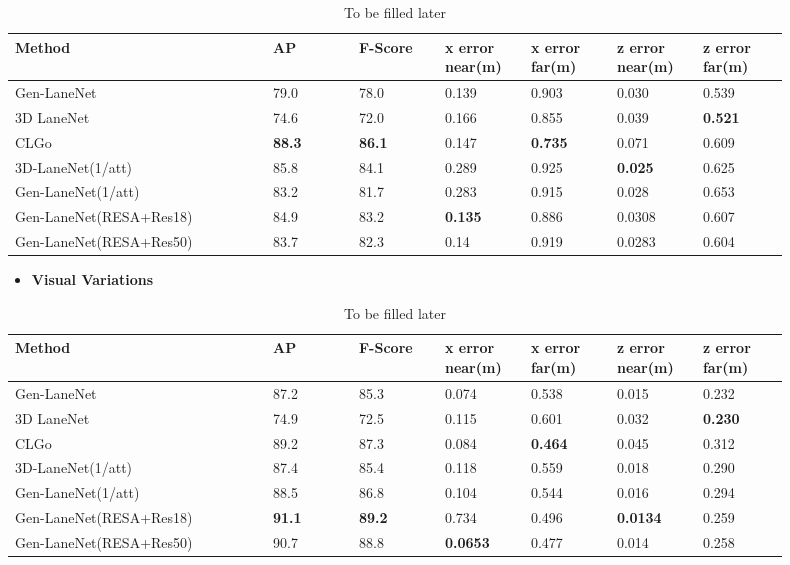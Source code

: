         \begin{table}[htbp]
    \centering
    \caption{To be filled later}
    \begin{tabular}{|p{0.3\linewidth}|p{0.1\linewidth}|p{0.1\linewidth}|p{0.1\linewidth}|p{0.1\linewidth}|p{0.1\linewidth}|p{0.1\linewidth}|}
    \hline
        \textbf{Method} & \textbf{AP} & \textbf{F-Score} & \textbf{x error near(m)} & \textbf{x error far(m)} & \textbf{z error near(m)} & \textbf{z error far(m)} \\ \hline
        Gen-LaneNet & 79.0 & 78.0 & 0.139 & 0.903 & 0.030 & 0.539 \\ \hline
        3D LaneNet & 74.6 & 72.0 & 0.166 & 0.855 & 0.039 &\textbf{ 0.521} \\ \hline
        CLGo &\textbf{ 88.3} &\textbf{ 86.1} & 0.147 & \textbf{0.735} & 0.071 & 0.609 \\ \hline
        3D-LaneNet(1/att) & 85.8 & 84.1 & 0.289 & 0.925 &\textbf{ 0.025} & 0.625 \\ \hline
        Gen-LaneNet(1/att) & 83.2 & 81.7 & 0.283 & 0.915 & 0.028 & 0.653 \\ \hline
        Gen-LaneNet(RESA+Res18) &  84.9 & 83.2 &\textbf{ 0.135} & 0.886 & 0.0308 & 0.607 \\ \hline
        Gen-LaneNet(RESA+Res50) & 83.7 & 82.3 & 0.14 & 0.919 & 0.0283 & 0.604 \\ \hline
    \end{tabular}
\end{table}

  \begin{itemize}
        \item \textbf{Visual Variations}
    \end{itemize}
    
        \begin{table}[htbp]
    \centering
    \caption{To be filled later}
    \begin{tabular}{|p{0.3\linewidth}|p{0.1\linewidth}|p{0.1\linewidth}|p{0.1\linewidth}|p{0.1\linewidth}|p{0.1\linewidth}|p{0.1\linewidth}|}
    \hline
        \textbf{Method} & \textbf{AP} & \textbf{F-Score} & \textbf{x error near(m)} & \textbf{x error far(m)} & \textbf{z error near(m)} & \textbf{z error far(m)} \\ \hline
        Gen-LaneNet & 87.2 & 85.3 & 0.074 & 0.538 & 0.015 & 0.232 \\ \hline
        3D LaneNet & 74.9 & 72.5 & 0.115 & 0.601 & 0.032 & \textbf{0.230} \\ \hline
        CLGo & 89.2 & 87.3 & 0.084 & \textbf{0.464} & 0.045 & 0.312 \\ \hline
        3D-LaneNet(1/att) & 87.4 & 85.4 & 0.118 & 0.559 & 0.018 & 0.290 \\ \hline
        Gen-LaneNet(1/att) & 88.5 & 86.8 & 0.104 & 0.544 & 0.016 & 0.294 \\ \hline
        Gen-LaneNet(RESA+Res18) & \textbf{ 91.1} &\textbf{ 89.2} & 0.734 & 0.496 & \textbf{0.0134} & 0.259 \\ \hline
        Gen-LaneNet(RESA+Res50) & 90.7 & 88.8 & \textbf{0.0653} & 0.477 & 0.014 & 0.258 \\ \hline
    \end{tabular}
\end{table}
